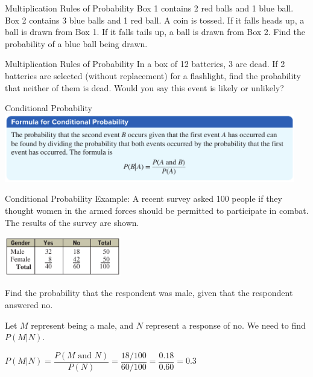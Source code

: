 \documentclass[t, aspectratio=169]{beamer}
\newcommand{\?}{\stackrel{?}{=}}
\begin{document}
	\begin{frame}{Multiplication Rules of Probability}
		Box 1 contains 2 red balls and 1 blue ball. Box 2 contains 3 blue balls and 1 red ball. A coin is tossed. If it falls heads up, a ball is drawn from Box 1. If it falls tails up, a ball is drawn from Box 2. Find the probability of a blue ball being drawn.
	\end{frame}

	\begin{frame}{Multiplication Rules of Probability}
		In a box of 12 batteries, 3 are dead. If 2 batteries are selected (without replacement) for a flashlight, find the probability that neither of them is dead. Would you say this event is likely or unlikely?
		\begin{flalign*}
		\end{flalign*}
	\end{frame}

	\begin{frame}{Conditional Probability}
		\includegraphics[width=5in]{cond-prob.png}
	\end{frame}

	\begin{frame}{Conditional Probability}
		Example: A recent survey asked 100 people if they thought women in the armed forces should be permitted to participate in combat. The results of the survey are shown.
		
		\includegraphics[width=2in]{female-mil.png}
		
		Find the probability that the respondent was male, given that the respondent answered no. \pause
		
		Let $M$ represent being a male, and $N$ represent a response of no. We need to find $P(M|N)$. \pause
		
		$P(M|N) = \dfrac{P(M \text{ and } N)}{P(N)} = \dfrac{18/100}{60/100} = \dfrac{0.18}{0.60} = 0.3$
	\end{frame}
\end{document}
